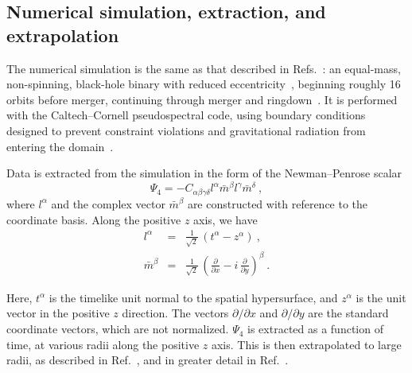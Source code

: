 \subsection{Numerical simulation, extraction, and extrapolation}
\label{sec:WaveformExtractionAndExtrapolation}
The numerical simulation is the same as that described in
Refs.~\cite{Boyle2007, Scheel2008}: an equal-mass, non-spinning,
black-hole binary with reduced
eccentricity~\cite{Pfeiffer-Brown-etal:2007}, beginning roughly 16
orbits before merger, continuing through merger and
ringdown~\cite{Scheel2008}.  It is performed with the Caltech--Cornell
pseudospectral code, using boundary conditions designed to prevent
constraint violations and gravitational radiation from entering the
domain~\cite{Holst2004, Lindblom2006}.

Data is extracted from the simulation in the form of the
Newman--Penrose scalar
\begin{equation}
  \Psi_{4} = -C_{\alpha \beta \gamma \delta} l^{\alpha}
  \bar{m}^{\beta} l^{\gamma} \bar{m}^{\delta}\ ,
\end{equation}
where $l^{\alpha}$ and the complex vector $\bar{m}^{\beta}$ are
constructed with reference to the coordinate basis.  Along the
positive $z$ axis, we have
\begin{eqnarray}
  l^{\alpha} &= & \frac{1}{\sqrt{2}}\, \left( t^{\alpha} - z^{\alpha}
  \right)\ , \\
  \bar{m}^{\beta} &= & \frac{1}{\sqrt{2}}\, \left(
    \frac{\partial}{\partial x} - i\, \frac{\partial}{\partial y}
  \right)^{\beta}\ .
\end{eqnarray}

Here, $t^{\alpha}$ is the timelike unit normal to the spatial
hypersurface, and $z^{\alpha}$ is the unit vector in the positive $z$
direction.  The vectors $\partial/\partial x$ and $\partial/\partial
y$ are the standard coordinate vectors, which are not normalized.
$\Psi_{4}$ is extracted as a function of time, at various radii along
the positive $z$ axis.  This is then extrapolated to large radii, as
described in Ref.~\cite{Boyle2007}, and in greater detail in
Ref.~\cite{Boyle2008}.


